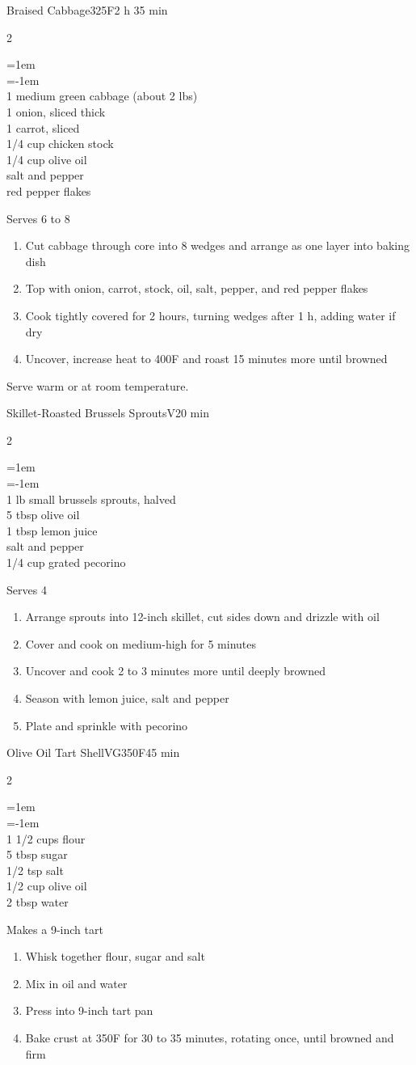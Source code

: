 \documentclass{article}
\newenvironment{recipe}[3][]
    {\begin{cardbase}[#1]{#2}{#3}
    \columnratio{0.333}
    \begin{paracol}{2}}
    {\end{paracol}\end{cardbase}}
\newcommand{\nextcolumn}{\switchcolumn}
\newenvironment{ingredients}
    {
    \begin{obeylines}
    \vspace{\parskip}
    \setlength{\parskip}{0.25em}
    \vspace{-0.25em}
    \leftskip=1em
    \parindent=-1em}
    {\end{obeylines}}
\newenvironment{steps}
    {\begin{enumerate}[leftmargin=*,topsep=0pt]}
    {\end{enumerate}}
\newcommand{\fahrenheit}[1]{#1\textdegree{}F}
\newcommand{\tag}[1]{\hspace{1em}#1}
\newcommand{\symboltag}[2]{\tag{#1\hspace{0.4em}#2}}
\newcommand{\totaltime}[1]{\symboltag{\raisebox{-0.1em}{\small\StopWatchEnd}}{#1}}
\newcommand{\preheat}[1]{\symboltag{\Topbottomheat}{#1}}
\begin{document}
\begin{recipe}{Braised Cabbage}{\preheat{\fahrenheit{325}}\totaltime{2 h 35 min}}
\begin{ingredients}
1 medium green cabbage (about 2 lbs)
1 onion, sliced thick
1 carrot, sliced
1/4 cup chicken stock
1/4 cup olive oil
salt and pepper
red pepper flakes
\end{ingredients}
\nextcolumn
Serves 6 to 8
\begin{steps}
    \item Cut cabbage through core into 8 wedges and arrange as one layer into baking dish
    \item Top with onion, carrot, stock, oil, salt, pepper, and red pepper flakes
    \item Cook tightly covered for 2 hours, turning wedges after 1 h, adding water if dry
    \item Uncover, increase heat to \fahrenheit{400} and roast 15 minutes more until browned
\end{steps}
Serve warm or at room temperature.
\end{recipe}

\begin{recipe}{Skillet-Roasted Brussels Sprouts}{\tag{V}\totaltime{20 min}}
\begin{ingredients}
1 lb small brussels sprouts, halved
5 tbsp olive oil
1 tbsp lemon juice
salt and pepper
1/4 cup grated\hphantom{skip} pecorino
\end{ingredients}
\nextcolumn
Serves 4
\begin{steps}
    \item Arrange sprouts into 12-inch skillet, cut sides down and drizzle with oil
    \item Cover and cook on medium-high for 5 minutes
    \item Uncover and cook 2 to 3 minutes more until deeply browned
    \item Season with lemon juice, salt and pepper
    \item Plate and sprinkle with pecorino
\end{steps}
\end{recipe}

\begin{recipe}{Olive Oil Tart Shell}{\tag{VG}\preheat{\fahrenheit{350}}\totaltime{45 min}}
\begin{ingredients}
1 1/2 cups flour
5 tbsp sugar
1/2 tsp salt
1/2 cup olive oil
2 tbsp water
\end{ingredients}
\nextcolumn
Makes a 9-inch tart
\begin{steps}
    \item Whisk together flour, sugar and salt
    \item Mix in oil and water
    \item Press into 9-inch tart pan
    \item Bake crust at \fahrenheit{350} for 30 to 35 minutes, rotating once, until browned and firm
\end{steps}
\end{recipe}
\end{document}
